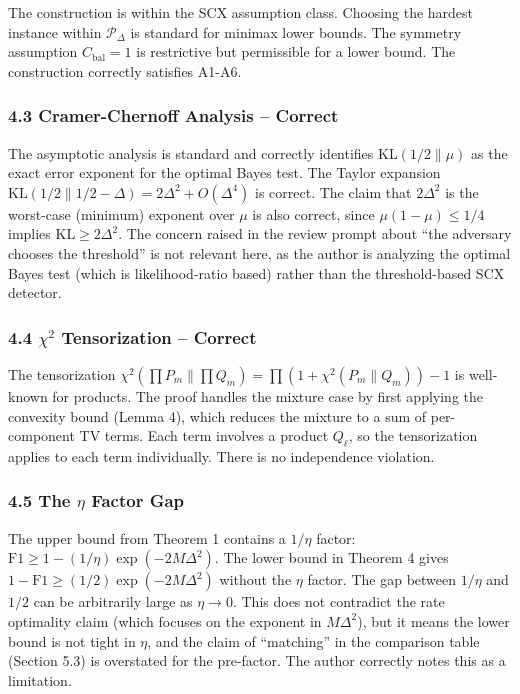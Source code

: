 \documentclass[
  12pt,
]{article}
\begin{document}
The construction is within the SCX assumption class. Choosing the
hardest instance within \(\mathcal{P}_\Delta\) is standard for minimax
lower bounds. The symmetry assumption \(C_{\text{bal}}=1\) is
restrictive but permissible for a lower bound. The construction
correctly satisfies A1-A6.

\subsubsection{4.3 Cramer-Chernoff Analysis --
Correct}\label{cramer-chernoff-analysis-correct}

The asymptotic analysis is standard and correctly identifies
\(\text{KL}(1/2 \| \mu)\) as the exact error exponent for the optimal
Bayes test. The Taylor expansion
\(\text{KL}(1/2 \| 1/2-\Delta) = 2\Delta^2 + O(\Delta^4)\) is correct.
The claim that \(2\Delta^2\) is the worst-case (minimum) exponent over
\(\mu\) is also correct, since \(\mu(1-\mu) \leq 1/4\) implies
\(\text{KL} \geq 2\Delta^2\). The concern raised in the review prompt
about ``the adversary chooses the threshold'' is not relevant here, as
the author is analyzing the optimal Bayes test (which is
likelihood-ratio based) rather than the threshold-based SCX detector.

\subsubsection{\texorpdfstring{4.4 \(\chi^2\) Tensorization --
Correct}{4.4 \textbackslash chi\^{}2 Tensorization -- Correct}}\label{chi2-tensorization-correct}

The tensorization
\(\chi^2(\prod P_m \| \prod Q_m) = \prod(1+\chi^2(P_m\|Q_m))-1\) is
well-known for products. The proof handles the mixture case by first
applying the convexity bound (Lemma 4), which reduces the mixture to a
sum of per-component TV terms. Each term involves a product \(Q_\ell\),
so the tensorization applies to each term individually. There is no
independence violation.

\subsubsection{\texorpdfstring{4.5 The \(\eta\) Factor
Gap}{4.5 The \textbackslash eta Factor Gap}}\label{the-eta-factor-gap}

The upper bound from Theorem 1 contains a \(1/\eta\) factor:
\(\text{F1} \geq 1 - (1/\eta)\exp(-2M\Delta^2)\). The lower bound in
Theorem 4 gives \(1-\text{F1} \geq (1/2)\exp(-2M\Delta^2)\) without the
\(\eta\) factor. The gap between \(1/\eta\) and \(1/2\) can be
arbitrarily large as \(\eta \to 0\). This does not contradict the rate
optimality claim (which focuses on the exponent in \(M\Delta^2\)), but
it means the lower bound is not tight in \(\eta\), and the claim of
``matching'' in the comparison table (Section 5.3) is overstated for the
pre-factor. The author correctly notes this as a limitation.
\end{document}
